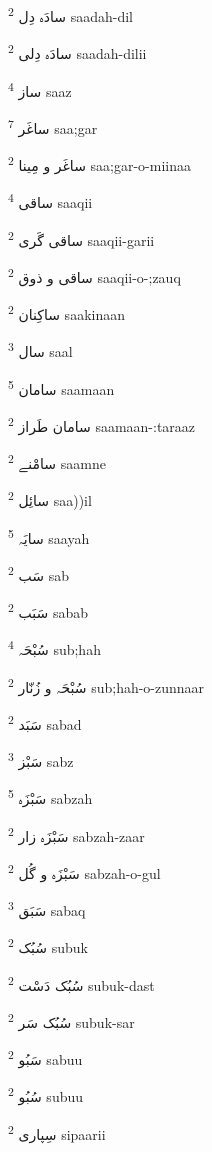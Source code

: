 \documentclass[12pt]{article}
\begin{document}
\begin{multicols}{5}
{\ur سادَہ دِل}   \textsuperscript{2} saadah-dil

{\ur سادَہ دِلی}   \textsuperscript{2} saadah-dilii

{\ur ساز}   \textsuperscript{4} saaz

{\ur ساغَر}   \textsuperscript{7} saa;gar

{\ur ساغَر و مِینا}   \textsuperscript{2} saa;gar-o-miinaa

{\ur ساقی}   \textsuperscript{4} saaqii

{\ur ساقی گَری}   \textsuperscript{2} saaqii-garii

{\ur ساقی و ذوق}   \textsuperscript{2} saaqii-o-;zauq

{\ur ساکِنان}   \textsuperscript{2} saakinaan

{\ur سال}   \textsuperscript{3} saal

{\ur سامان}   \textsuperscript{5} saamaan

{\ur سامان طَراز}   \textsuperscript{2} saamaan-:taraaz

{\ur سامْنے}   \textsuperscript{2} saamne

{\ur سائِل}   \textsuperscript{2} saa))il

{\ur سایَہ}   \textsuperscript{5} saayah

{\ur سَب}   \textsuperscript{2} sab

{\ur سَبَب}   \textsuperscript{2} sabab

{\ur سُبْحَہ}   \textsuperscript{4} sub;hah

{\ur سُبْحَہ و زُنّار}   \textsuperscript{2} sub;hah-o-zunnaar

{\ur سَبَد}   \textsuperscript{2} sabad

{\ur سَبْز}   \textsuperscript{3} sabz

{\ur سَبْزَہ}   \textsuperscript{5} sabzah

{\ur سَبْزَہ زار}   \textsuperscript{2} sabzah-zaar

{\ur سَبْزَہ و گُل}   \textsuperscript{2} sabzah-o-gul

{\ur سَبَق}   \textsuperscript{3} sabaq

{\ur سُبُک}   \textsuperscript{2} subuk

{\ur سُبُک دَسْت}   \textsuperscript{2} subuk-dast

{\ur سُبُک سَر}   \textsuperscript{2} subuk-sar

{\ur سَبُو}   \textsuperscript{2} sabuu

{\ur سُبُو}   \textsuperscript{2} subuu

{\ur سِپاری}   \textsuperscript{2} sipaarii


\end{multicols}
\end{document}

